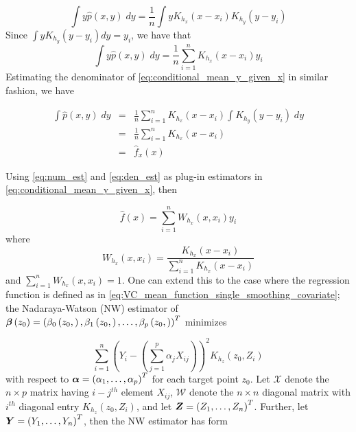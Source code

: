 \documentclass[12pt]{article}
\newcommand{\bfbeta}{\mbox{\boldmath $\beta$}}
\newcommand{\bfalpha}{\mbox{\boldmath $\alpha$}}
\newcommand{\bfY}{\mbox{\boldmath $Y$}}
\newcommand{\bfZ}{\mbox{\boldmath $Z$}}
\begin{document}
{\begin{equation} \nonumber 
\int y \hat{p}\left(x,y\right)\;dy = \frac{1}{n} \int y K_{h_x}\left(x-x_i\right) K_{h_y}\left(y-y_i\right)
\end{equation} 
\noindent
Since $\int yK_{h_y}\left(y-y_i\right)dy = y_i$, we have that 
\begin{equation} \label{eq:num_est}
\int y \hat{p}\left(x,y\right)\;dy = \frac{1}{n}\sum_{i=1}^n K_{h_x}\left(x-x_i\right) y_i 
\end{equation} 
\noindent
Estimating the denominator of \ref{eq:conditional_mean_y_given_x} in similar fashion, we have 

\begin{eqnarray}
\int \hat{p}\left(x,y\right)\;dy &=& \frac{1}{n}\sum_{i=1}^{n} K_{h_x}\left(x-x_i\right) \int K_{h_y}\left(y-y_i\right)\;dy \nonumber \\
&=& \frac{1}{n}\sum_{i=1}^{n} K_{h_x}\left(x-x_i\right) \nonumber \\
&=& \hat{f}_x\left(x\right) \label{eq:den_est} 
\end{eqnarray}

Using \ref{eq:num_est} and \ref{eq:den_est} as plug-in estimators in \ref{eq:conditional_mean_y_given_x}, then 

\begin{equation} 
\hat{f}\left(x\right) = \sum_{i=1}^n W_{h_x}\left(x,x_i\right)y_i
\end{equation}
\noindent
where 
\begin{equation} \nonumber
W_{h_x}\left(x,x_i\right) = \frac{K_{h_x}\left(x-x_i\right) }{\sum_{i=1}^{n} K_{h_x}\left(x-x_i\right)}
\end{equation}
\noindent
and $\sum_{i=1}^n W_{h_x}\left(x,x_i\right) = 1$. One can extend this to the case where the regression function is defined as in \ref{eq:VC_mean_function_single_smoothing_covariate}; the Nadaraya-Watson (NW) estimator of $\bfbeta\left(z_0\right) = \left(\beta_0\left(z_0,\right), \beta_1\left(z_0,\right),\dots,\beta_p\left(z_0,\right)\right)^T$ minimizes

\begin{equation} \nonumber 
\sum_{i=1}^n \left(Y_i - \left(\sum_{j=1}^p \alpha_j X_{ij}\right)\right)^2 K_{h_z}\left(z_0,Z_i\right)
\end{equation} 
\noindent
with respect to $\bfalpha = \left( \alpha_1, \dots, \alpha_p\right)^T$ for each target point $z_0$. Let $\mathcal{X}$ denote the $n \times p$ matrix having $i-j^{th}$ element $X_{ij}$, $\mathcal{W}$ denote the $n \times n$ diagonal matrix with $i^{th}$ diagonal entry $K_{h_z}\left(z_0, Z_i\right)$, and let $\bfZ = \left(Z_1, \dots, Z_n\right)^T$. Further, let $\bfY = \left(Y_1, \dots, Y_n\right)^T$, then the NW estimator has form

}
\end{document}
